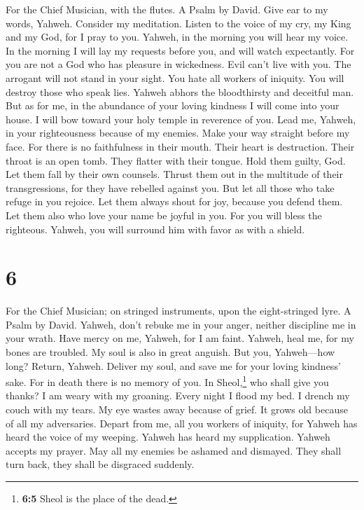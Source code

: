 For the Chief Musician, with the flutes. A Psalm by David.
 Give ear to my words, Yahweh. Consider my meditation.
 Listen to the voice of my cry, my King and my God, for I
pray to you.  Yahweh, in the morning you will hear my
voice. In the morning I will lay my requests before you, and will watch
expectantly.  For you are not a God who has pleasure in
wickedness. Evil can't live with you.  The arrogant will
not stand in your sight. You hate all workers of iniquity.
 You will destroy those who speak lies. Yahweh abhors the
bloodthirsty and deceitful man.  But as for me, in the
abundance of your loving kindness I will come into your house. I will
bow toward your holy temple in reverence of you.  Lead me,
Yahweh, in your righteousness because of my enemies. Make your way
straight before my face.  For there is no faithfulness in
their mouth. Their heart is destruction. Their throat is an open tomb.
They flatter with their tongue.  Hold them guilty, God.
Let them fall by their own counsels. Thrust them out in the multitude of
their transgressions, for they have rebelled against you.
 But let all those who take refuge in you rejoice. Let
them always shout for joy, because you defend them. Let them also who
love your name be joyful in you.  For you will bless the
righteous. Yahweh, you will surround him with favor as with a shield.

\hypertarget{section-5}{%
\section{6}\label{section-5}}

For the Chief Musician; on stringed instruments, upon the eight-stringed
lyre. A Psalm by David.  Yahweh, don't rebuke me in your
anger, neither discipline me in your wrath.  Have mercy on
me, Yahweh, for I am faint. Yahweh, heal me, for my bones are troubled.
 My soul is also in great anguish. But you, Yahweh---how
long?  Return, Yahweh. Deliver my soul, and save me for
your loving kindness' sake.  For in death there is no
memory of you. In Sheol,\footnote{\textbf{6:5} Sheol is the place of the
  dead.} who shall give you thanks?  I am weary with my
groaning. Every night I flood my bed. I drench my couch with my tears.
 My eye wastes away because of grief. It grows old because
of all my adversaries.  Depart from me, all you workers of
iniquity, for Yahweh has heard the voice of my weeping. 
Yahweh has heard my supplication. Yahweh accepts my prayer.
 May all my enemies be ashamed and dismayed. They shall
turn back, they shall be disgraced suddenly.

